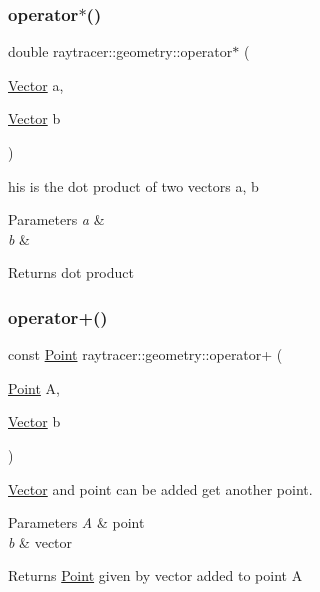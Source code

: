 \subsubsection{\texorpdfstring{operator$\ast$()}{operator*()}\hspace{0.1cm}{\footnotesize\ttfamily [3/3]}}
{\footnotesize\ttfamily double raytracer\+::geometry\+::operator$\ast$ (\begin{DoxyParamCaption}\item[{\hyperlink{classraytracer_1_1geometry_1_1Vector}{Vector}}]{a,  }\item[{\hyperlink{classraytracer_1_1geometry_1_1Vector}{Vector}}]{b }\end{DoxyParamCaption})}



his is the dot product of two vectors a, b 


\begin{DoxyParams}{Parameters}
{\em a} & \\
\hline
{\em b} & \\
\hline
\end{DoxyParams}
\begin{DoxyReturn}{Returns}
dot product 
\end{DoxyReturn}
\mbox{\label{namespaceraytracer_1_1geometry_aa576460b4f567015830e98247c12f3ce}} 
\subsubsection{\texorpdfstring{operator+()}{operator+()}\hspace{0.1cm}{\footnotesize\ttfamily [1/3]}}
{\footnotesize\ttfamily const \hyperlink{classraytracer_1_1geometry_1_1Point}{Point} raytracer\+::geometry\+::operator+ (\begin{DoxyParamCaption}\item[{\hyperlink{classraytracer_1_1geometry_1_1Point}{Point}}]{A,  }\item[{\hyperlink{classraytracer_1_1geometry_1_1Vector}{Vector}}]{b }\end{DoxyParamCaption})}



\hyperlink{classraytracer_1_1geometry_1_1Vector}{Vector} and point can be added get another point. 


\begin{DoxyParams}{Parameters}
{\em A} & point \\
\hline
{\em b} & vector \\
\hline
\end{DoxyParams}
\begin{DoxyReturn}{Returns}
\hyperlink{classraytracer_1_1geometry_1_1Point}{Point} given by vector added to point A 
\end{DoxyReturn}
\mbox{\label{namespaceraytracer_1_1geometry_aaf48be2ee020c2f48557c6361dfd64d1}} 
